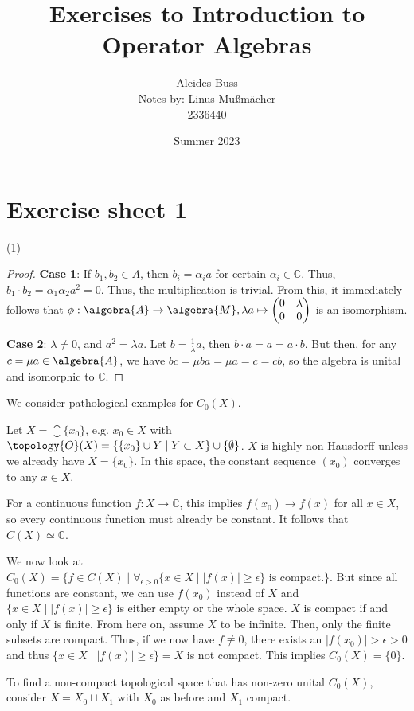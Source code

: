 \documentclass[a4paper]{article}
\title{Exercises to Introduction to Operator Algebras}
\author{Alcides Buss\\Notes by: Linus Mußmächer\\2336440}
\date{Summer 2023}
\begin{document}
\maketitle


\tableofcontents

\newpage

\section{Exercise sheet 1}

\begin{exercise}
	(1)
\end{exercise}

\begin{proof}
	\textbf{Case 1}: If $b_1, b_2 \in A$, then $b_i = \alpha_i a$ for certain $\alpha_i \in \mathbb{C}$. Thus, $b_1 \cdot b_2 = \alpha_1 \alpha_2 a^2 = 0$. Thus, the multiplication is trivial. From this, it immediately follows that $\phi: \algebra{A} \to \algebra{M}, \lambda a \mapsto \qmatrix{0 & \lambda \\ 0 & 0}$ is an isomorphism.

	\textbf{Case 2}: $\lambda \neq 0$, and $a^2 = \lambda a$. Let $b = \frac{1}{\lambda} a$, then $b \cdot a = a = a \cdot b$. But then, for any $c = \mu a \in \algebra{A}$, we have $b c = \mu b a = \mu a = c = c b$, so the algebra is unital and isomorphic to $\mathbb{C}$.
\end{proof}


\begin{exercise}[2]
	We consider pathological examples for $C_0(X)$.

	Let $X = \closure{\{x_0\}}$, e.g. $x_0 \in X$ with $\topology{O}(X) = \{\{x_0\} \cup Y \mid Y \subset X\} \cup \{\emptyset\}$. $X$ is highly non-Hausdorff unless we already have $X = \{x_0\}$.	In this space, the constant sequence $(x_0)$ converges to any $x \in X$.

	For a continuous function $f: X \to \mathds{C}$, this implies $f(x_0) \to f(x)$ for all $x \in X$, so every continuous function must already be constant. It follows that $C(X) \simeq \mathds{C}$.

	We now look at $C_0(X) = \{f \in C(X) \mid \forall_{\epsilon > 0} \{x \in X \mid  |f(x)| \geq \epsilon \} \text{ is compact.}\}$. But since all functions are constant, we can use $f(x_0)$ instead of $X$ and $\{x \in X \mid  |f(x)| \geq \epsilon \}$ is either empty or the whole space. $X$ is compact if and only if $X$ is finite. From here on, assume $X$ to be infinite. Then, only the finite subsets are compact. Thus, if we now have $f \not \equiv 0$, there exists an $|f(x_0)| > \epsilon > 0$ and thus $\{x \in X \mid  |f(x)| \geq \epsilon \} = X$ is not compact. This implies $C_0(X) = \{0\}$.

	To find a non-compact topological space that has non-zero unital $C_0(X)$, consider $X = X_0 \sqcup X_1$ with $X_0$ as before and $X_1$ compact.
\end{exercise}
\end{document}
